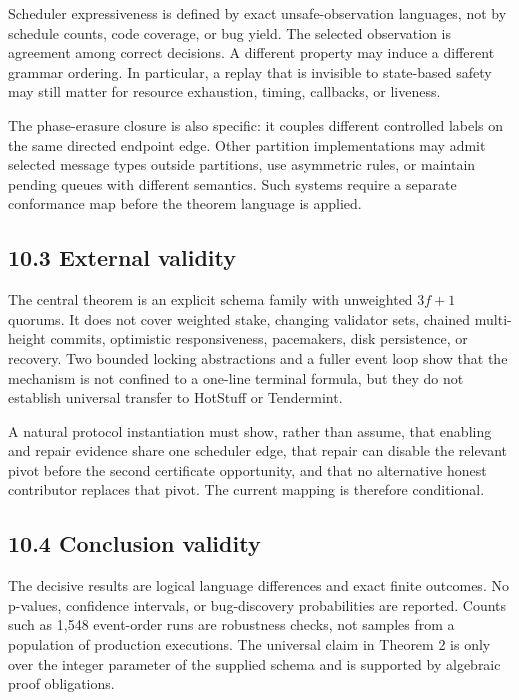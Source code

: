 \documentclass[10pt,a4paper]{article}
\begin{document}
Scheduler expressiveness is defined by exact unsafe-observation
languages, not by schedule counts, code coverage, or bug yield. The
selected observation is agreement among correct decisions. A different
property may induce a different grammar ordering. In particular, a
replay that is invisible to state-based safety may still matter for
resource exhaustion, timing, callbacks, or liveness.

The phase-erasure closure is also specific: it couples different
controlled labels on the same directed endpoint edge. Other partition
implementations may admit selected message types outside partitions, use
asymmetric rules, or maintain pending queues with different semantics.
Such systems require a separate conformance map before the theorem
language is applied.

\subsection{10.3 External validity}\label{external-validity}

The central theorem is an explicit schema family with unweighted
\(3f+1\) quorums. It does not cover weighted stake, changing validator
sets, chained multi-height commits, optimistic responsiveness,
pacemakers, disk persistence, or recovery. Two bounded locking
abstractions and a fuller event loop show that the mechanism is not
confined to a one-line terminal formula, but they do not establish
universal transfer to HotStuff or Tendermint.

A natural protocol instantiation must show, rather than assume, that
enabling and repair evidence share one scheduler edge, that repair can
disable the relevant pivot before the second certificate opportunity,
and that no alternative honest contributor replaces that pivot. The
current mapping is therefore conditional.

\subsection{10.4 Conclusion validity}\label{conclusion-validity}

The decisive results are logical language differences and exact finite
outcomes. No p-values, confidence intervals, or bug-discovery
probabilities are reported. Counts such as 1,548 event-order runs are
robustness checks, not samples from a population of production
executions. The universal claim in Theorem 2 is only over the integer
parameter of the supplied schema and is supported by algebraic proof
obligations.
\end{document}
